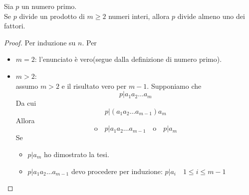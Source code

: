 \documentclass[a4paper,12pt, oneside]{book}
\begin{document}
\begin{lemma}
	Sia $p$ un numero primo.\\
	Se $p$ divide un prodotto di $m \geq 2$ numeri interi, allora $p$ divide almeno uno dei fattori.

	\begin{proof}
		Per induzione su $n$.
		Per \begin{itemize}
			\item $m = 2$: l'enunciato è vero(segue dalla definizione di numero primo).
			\item $m > 2$:\\
			      assumo $m>2$ e il risultato vero per $m-1$.
			      Supponiamo che $$p|a_1a_2 \dots a_m$$
			      Da cui $$p|(a_1a_2 \dots a_{m-1}) a_m$$
			      Allora $$\mbox{o} \quad p|a_1a_2 \dots a_{m-1} \quad \mbox{o} \quad p|a_m$$
			      Se \begin{itemize}
				      \item $p|a_m$ ho dimostrato la tesi.
				      \item $p|a_1a_2 \dots a_{m-1}$ devo procedere per induzione: $p|a_i \quad 1 \leq i \leq m-1$
			      \end{itemize}
		\end{itemize}
	\end{proof}
\end{lemma}
\end{document}
